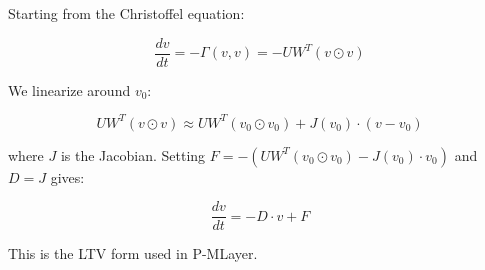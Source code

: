 \documentclass[12pt]{article}
\begin{document}
Starting from the Christoffel equation:

\begin{equation}
\frac{dv}{dt} = -\Gamma(v, v) = -U W^T (v \odot v)
\end{equation}

We linearize around $v_0$:

\begin{equation}
U W^T (v \odot v) \approx U W^T (v_0 \odot v_0) + J(v_0) \cdot (v - v_0)
\end{equation}

where $J$ is the Jacobian. Setting $F = -(U W^T (v_0 \odot v_0) - J(v_0) \cdot v_0)$ and $D = J$ gives:

\begin{equation}
\frac{dv}{dt} = -D \cdot v + F
\end{equation}

This is the LTV form used in P-MLayer.
\end{document}
